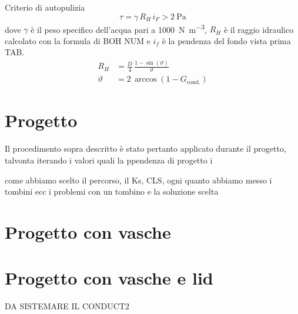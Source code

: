 Criterio di autopulizia
\begin{equation}
    \tau = \gamma \, R_H \, i_F > \SI{2}{\pascal}
\end{equation}
dove $\gamma$ è il peso specifico dell'acqua pari a \SI{1000}{\newton\per\metre\cubed}, $R_H$ è il raggio idraulico calcolato con la formula di BOH NUM e $i_f$ è la pendenza del fondo vista prima TAB.  
\begin{align}
    R_H &= \frac{D}{4} \, \frac{1 - \sin(\vartheta)}{\vartheta} \\
    \vartheta &= 2 \, \arccos(1 - G_\text{cond.})
\end{align}






\section{Progetto}
Il procedimento sopra descritto è stato pertanto applicato durante il progetto, talvonta iterando i valori quali la ppendenza di progetto i 

come abbiamo scelto il percorso, il Ks, CLS, ogni quanto abbiamo messo i tombini ecc
i problemi con un tombino e la soluzione scelta

\section{Progetto con vasche}

\section{Progetto con vasche e lid}
DA SISTEMARE IL CONDUCT2



\appendix
